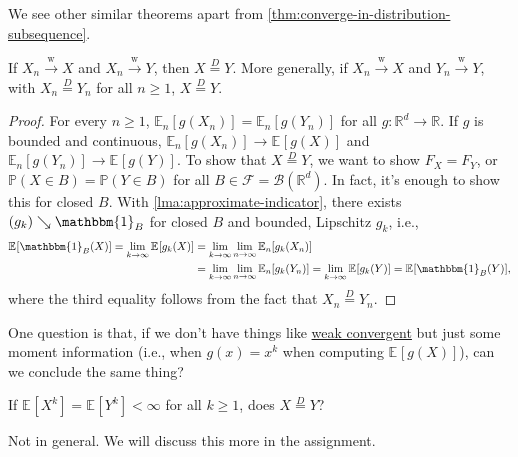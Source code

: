 We see other similar theorems apart from \autoref{thm:converge-in-distribution-subsequence}.

\begin{theorem}\label{thm:converge-in-distribution-unique}
	If \(X_n \overset{\text{w} }{\to } X\) and \(X_n \overset{\text{w} }{\to } Y\), then \(X \overset{D}{=} Y\). More generally, if \(X_n \overset{\text{w} }{\to } X\) and \(Y_n \overset{\text{w} }{\to } Y\), with \(X_n \overset{D}{=} Y_n\) for all \(n \geq 1\), \(X \overset{D}{=} Y\).
\end{theorem}
\begin{proof}
	For every \(n \geq 1\), \(\mathbb{E}_{n}[g(X_n)] = \mathbb{E}_{n}[g(Y_n)] \) for all \(g \colon \mathbb{R} ^d \to \mathbb{R} \). If \(g\) is bounded and continuous, \(\mathbb{E}_{n}[g(X_n)] \to \mathbb{E}_{}[g(X)] \) and \(\mathbb{E}_{n}[g(Y_n)] \to \mathbb{E}_{}[g(Y)] \). To show that \(X \overset{D}{=} Y\), we want to show \(F_X = F_Y\), or \(\mathbb{P} (X \in B) = \mathbb{P} (Y \in B)\) for all \(B \in \mathscr{F} = \mathcal{B} (\mathbb{R} ^d)\). In fact, it's enough to show this for closed \(B\). With \autoref{lma:approximate-indicator}, there exists \((g_k) \searrow \mathbbm{1}_{B} \) for closed \(B\) and bounded, Lipschitz \(g_k\), i.e.,
	\[
		\begin{split}
			\mathbb{E}_{}[\mathbbm{1}_{B} (X)]
			= \lim_{k \to \infty} \mathbb{E}_{}[g_k(X)]
			 & = \lim_{k \to \infty} \lim_{n \to \infty} \mathbb{E}_{n}[g_k(X_n)] \\
			 & = \lim_{k \to \infty} \lim_{n \to \infty} \mathbb{E}_{n}[g_k(Y_n)]
			= \lim_{k \to \infty} \mathbb{E}_{}[g_k(Y)]
			= \mathbb{E}_{}[\mathbbm{1}_{B} (Y)],
		\end{split}
	\]
	where the third equality follows from the fact that \(X_n \overset{D}{=} Y_n \).
\end{proof}

One question is that, if we don't have things like \hyperref[def:converge-weakly]{weak convergent} but just some moment information (i.e., when \(g(x) = x^k\) when computing \(\mathbb{E}_{}[g(X)] \)), can we conclude the same thing?

\begin{problem*}
	If \(\mathbb{E}_{}[X^k] = \mathbb{E}_{}[Y^k] < \infty \) for all \(k \geq 1\), does \(X \overset{D}{=} Y\)?
\end{problem*}
\begin{answer}
	Not in general. We will discuss this more in the assignment.
\end{answer}

